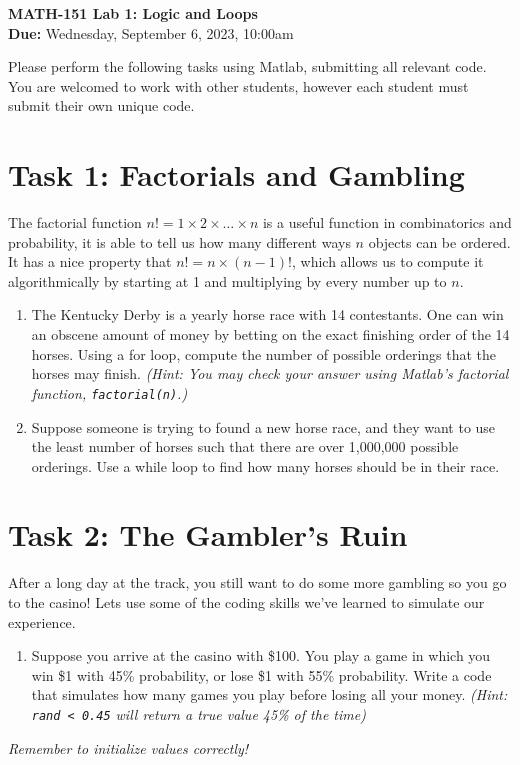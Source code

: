 \documentclass[11pt]{article}
\begin{document}
	
	\begin{center}
		\Large{\textbf{MATH-151 Lab 1: Logic and Loops}}\\
			\medskip
		\normalsize{\textbf{Due:} Wednesday, September 6, 2023, 10:00am} 
	\end{center}
	\noindent\makebox[\linewidth]{\rule{\textwidth}{0.4pt}}
	Please perform the following tasks using Matlab, submitting all relevant code. You are welcomed to work with other students, however each student must submit their own unique code.
	\section*{Task 1: Factorials and Gambling}
	\noindent The factorial function $n! = 1\times2\times\dots\times n$ is a useful function in combinatorics and probability, it is able to tell us how many different ways $n$ objects can be ordered. It has a nice property that $n!=n\times(n-1)!$, which allows us to compute it algorithmically by starting at 1 and multiplying by every number up to $n$. \\
	\begin{enumerate}[label=\alph*)]
		\item The Kentucky Derby is a yearly horse race with 14 contestants. One can win an obscene amount of money by betting on the exact finishing order of the 14 horses. Using a for loop, compute the number of possible orderings that the horses may finish. \textit{(Hint: You may check your answer using Matlab's factorial function, \texttt{factorial(n)}.)}
		\item Suppose someone is trying to found a new horse race, and they want to use the least number of horses such that there are over 1,000,000 possible orderings. Use a while loop to find how many horses should be in their race.
	\end{enumerate}
	\section*{Task 2: The Gambler's Ruin}
	\noindent After a long day at the track, you still want to do some more gambling so you go to the casino! Lets use some of the coding skills we've learned to simulate our experience.\\
	\begin{enumerate}[label=\alph*)]
		\item Suppose you arrive at the casino with \$100. You play a game in which you win \$1 with 45\% probability, or lose \$1 with 55\% probability. Write a code that simulates how many games you play before losing all your money. \textit{(Hint: \texttt{rand < 0.45} will return a true value 45\% of the time)} 
	\end{enumerate}

	\begin{center}
		\vfill
		\textit{Remember to initialize values correctly!}
	\end{center}
\end{document}
